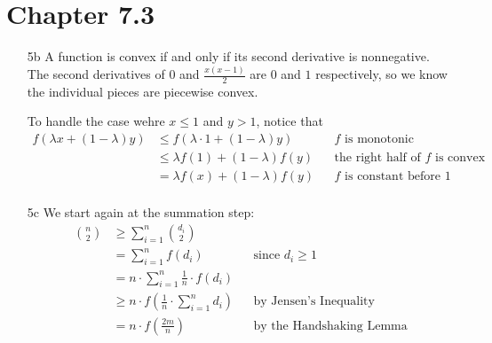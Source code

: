 \documentclass[12pt]{article}
\begin{document}
\section{Chapter 7.3}

\begin{enumerate}
    \item[5b] A function is convex if and only if its second derivative is nonnegative.
        The second derivatives of $0$ and $\frac{x(x-1)}{2}$ are $0$ and $1$ respectively,
        so we know the individual pieces are piecewise convex.

        To handle the case wehre $x \le 1$ and $y > 1$, notice that
        \begin{align*}
            f(\lambda x + (1-\lambda)y)
             & \le f(\lambda \cdot 1 + (1-\lambda) y) &  & \text{$f$ is monotonic}                \\
             & \le \lambda f(1) + (1-\lambda)f(y)     &  & \text{the right half of $f$ is convex} \\
             & = \lambda f(x) + (1-\lambda)f(y)       &  & \text{$f$ is constant before $1$}      \\
        \end{align*}

    \item[5c] We start again at the summation step:
        \begin{align*}
            \binom{n}{2}
             & \ge \sum_{i=1}^{n} \binom{d_i}{2}                                                                   \\
             & = \sum_{i=1}^{n} f(d_i)                                        &  & \text{since $d_i \ge 1$}        \\
             & = n \cdot \sum_{i=1}^{n} \frac{1}{n} \cdot f(d_i)                                                   \\
             & \ge n \cdot f\left(\frac{1}{n} \cdot \sum_{i=1}^{n} d_i\right) &  & \text{by Jensen's Inequality}   \\
             & = n \cdot f\left(\frac{2m}{n}\right)                           &  & \text{by the Handshaking Lemma}
        \end{align*}


\end{enumerate}
\end{document}
